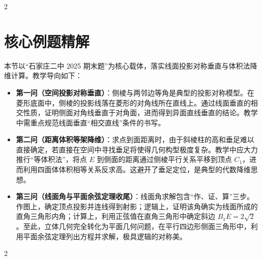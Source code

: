 \documentclass[11pt,a4paper]{ctexart}
\begin{document}
\begin{paracol}{2}
\switchcolumn
{}
\end{paracol}

\newpage
\section{核心例题精解}

本节以“石家庄二中 2025 期末题”为核心载体，落实线面投影对称垂直与体积法降维计算。教学导向如下：
\begin{itemize}
  \item \textbf{第一问（空间投影对称垂直）}：侧棱与两邻边等角是典型的投影对称模型。在菱形底面中，侧棱的投影线落在菱形的对角线所在直线上。通过线面垂直的相交性质，证明侧面对角线垂直于对角面，进而得到异面直线垂直的结论。教学中需重点规范线面垂直“相交直线”条件的书写。
  \item \textbf{第二问（距离体积等架降维）}：求点到面距离时，由于斜棱柱的高和垂足难以直接确定，若直接在空间中寻找垂足将使得几何构型极度复杂。教学中应大力推行“等体积法”，将点 $E$ 到侧面的距离通过侧棱平行关系平移到顶点 $C_1$，进而利用四面体体积相等关系反求高。这避开了垂足定位，是典型的代数降维思想。
  \item \textbf{第三问（线面角与平面余弦定理收尾）}：线面角求解包含“作、证、算”三步。作图上，确定顶点投影并连线得到射影；逻辑上，证明该角确实为线面所成的直角三角形内角；计算上，利用正弦值在直角三角形中确定斜边 $B_1E = 2\sqrt{2}$。至此，立体几何完全转化为平面几何问题，在平行四边形侧面三角形中，利用平面余弦定理列出方程并求解，极具逻辑的对称美。
\end{itemize}

{\small \qSolidShijiazhuangPrismStem}
\begin{center}
  \qSolidShijiazhuangPrismFigure[1.8]
\end{center}

\begin{paracol}{2}
\switchcolumn
{}
\end{paracol}
\end{document}
